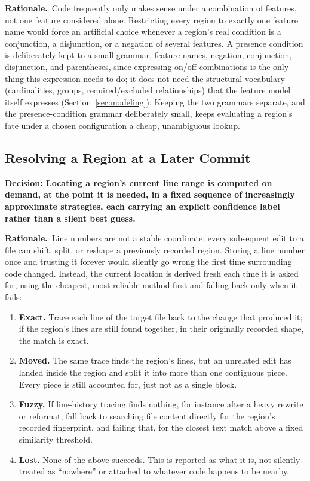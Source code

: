 \documentclass[11pt]{article}
\newcommand{\decision}[1]{\medskip\noindent\textbf{Decision: #1}\par\nopagebreak\smallskip}
\newcommand{\rationale}{\noindent\textbf{Rationale.}\ }
\begin{document}
\rationale Code frequently only makes sense under a combination of
features, not one feature considered alone. Restricting every region to
exactly one feature name would force an artificial choice whenever a
region's real condition is a conjunction, a disjunction, or a negation of
several features. A presence condition is deliberately kept to a small
grammar, feature names, negation, conjunction, disjunction, and
parentheses, since expressing on/off combinations is the only thing this
expression needs to do; it does not need the structural vocabulary
(cardinalities, groups, required/excluded relationships) that the feature
model itself expresses (Section~\ref{sec:modeling}). Keeping the two
grammars separate, and the presence-condition grammar deliberately small,
keeps evaluating a region's fate under a chosen configuration a cheap,
unambiguous lookup.

\subsection{Resolving a Region at a Later Commit}
\label{sec:resolution}

\decision{Locating a region's current line range is computed on demand,
at the point it is needed, in a fixed sequence of increasingly
approximate strategies, each carrying an explicit confidence label rather
than a silent best guess.}

\rationale Line numbers are not a stable coordinate: every subsequent
edit to a file can shift, split, or reshape a previously recorded region.
Storing a line number once and trusting it forever would silently go
wrong the first time surrounding code changed. Instead, the current
location is derived fresh each time it is asked for, using the cheapest,
most reliable method first and falling back only when it fails:

\begin{enumerate}[leftmargin=1.6em]
  \item \textbf{Exact.} Trace each line of the target file back to the
    change that produced it; if the region's lines are still found
    together, in their originally recorded shape, the match is exact.
  \item \textbf{Moved.} The same trace finds the region's lines, but an
    unrelated edit has landed inside the region and split it into more
    than one contiguous piece. Every piece is still accounted for, just
    not as a single block.
  \item \textbf{Fuzzy.} If line-history tracing finds nothing, for
    instance after a heavy rewrite or reformat, fall back to searching
    file content directly for the region's recorded fingerprint, and
    failing that, for the closest text match above a fixed similarity
    threshold.
  \item \textbf{Lost.} None of the above succeeds. This is reported as
    what it is, not silently treated as ``nowhere'' or attached to
    whatever code happens to be nearby.
\end{enumerate}
\end{document}
